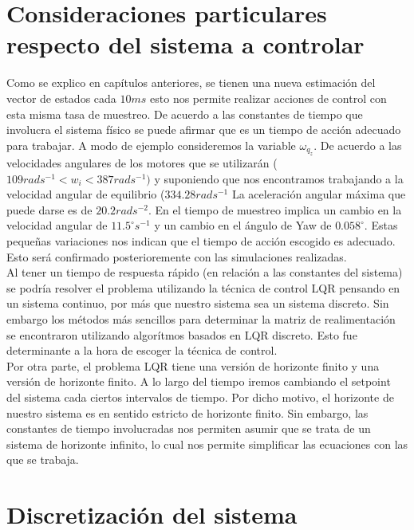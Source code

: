 \documentclass[main]{subfiles}
\begin{document}
\section{Consideraciones particulares respecto del sistema a controlar}

Como se explico en cap\'itulos anteriores, se tienen una nueva estimaci\'on del vector de estados cada $10 ms$ esto nos permite realizar acciones de control con esta misma tasa de muestreo. De acuerdo a las constantes de tiempo que involucra el sistema f\'isico se puede afirmar que es un tiempo de acci\'on adecuado para trabajar. A modo de ejemplo consideremos la variable $\omega_{q_z}$. De acuerdo a las velocidades angulares de los motores que se utilizar\'an ($109 rads^{-1} < w_i < 387 rads^{-1})$ y suponiendo que nos encontramos trabajando a la velocidad angular de equilibrio ($334.28 rads^{-1}$ La aceleraci\'on angular m\'axima que puede darse es de $20.2 rad s^{-2}$. En el tiempo de muestreo implica un cambio en la velocidad angular de $11.5 ^{\circ} s^{-1}$ y un cambio en el \'angulo de Yaw de $0.058^{\circ}$. Estas pequeñas variaciones nos indican que el tiempo de acci\'on escogido es adecuado. Esto ser\'a confirmado posterioremente con las simulaciones realizadas. \\

Al tener un tiempo de respuesta r\'apido (en relaci\'on a las constantes del sistema) se podr\'ia resolver el problema utilizando la t\'ecnica de control LQR pensando en un sistema continuo, por m\'as que nuestro sistema sea un sistema discreto. Sin embargo los m\'etodos m\'as sencillos para determinar la matriz de realimentaci\'on se encontraron utilizando algor\'itmos basados en LQR discreto. Esto fue determinante a la hora de escoger la t\'ecnica de control.\\

Por otra parte, el problema LQR tiene una versi\'on de horizonte finito y una versi\'on de horizonte finito. A lo largo del tiempo iremos cambiando el setpoint del sistema cada ciertos intervalos de tiempo. Por dicho motivo, el horizonte de nuestro sistema es en sentido estricto de horizonte finito. Sin embargo, las constantes de tiempo involucradas nos permiten asumir que se trata de un sistema de horizonte infinito, lo cual nos permite simplificar las ecuaciones con las que se trabaja.\\

\section{Discretizaci\'on del sistema}
\end{document}
